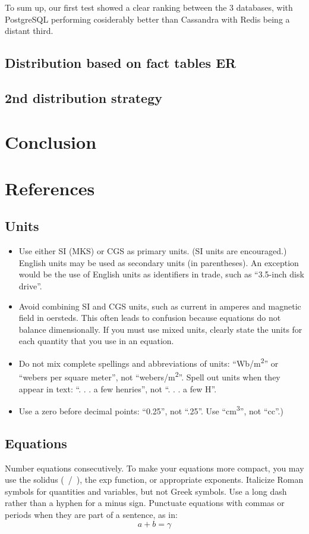 \documentclass[conference]{IEEEtran}
\begin{document}
To sum up, our first test showed a clear ranking between the 3 databases, with PostgreSQL performing cosiderably better than Cassandra with Redis being a distant third.

\subsection{Distribution based on fact tables ER}
\label{sec:distribution-based-on-fact-tables-er}


\subsection{2nd distribution strategy}
\label{sec:2nd-distribution-strategy}

\section{Conclusion}
\section{References}
\subsection{Units}
\begin{itemize}
	\item Use either SI (MKS) or CGS as primary units. (SI units are encouraged.) English units may be used as secondary units (in parentheses). An exception would be the use of English units as identifiers in trade, such as ``3.5-inch disk drive''.
	\item Avoid combining SI and CGS units, such as current in amperes and magnetic field in oersteds. This often leads to confusion because equations do not balance dimensionally. If you must use mixed units, clearly state the units for each quantity that you use in an equation.
	\item Do not mix complete spellings and abbreviations of units: ``Wb/m\textsuperscript{2}'' or ``webers per square meter'', not ``webers/m\textsuperscript{2}''. Spell out units when they appear in text: ``. . . a few henries'', not ``. . . a few H''.
	\item Use a zero before decimal points: ``0.25'', not ``.25''. Use ``cm\textsuperscript{3}'', not ``cc''.)
\end{itemize}

\subsection{Equations}
Number equations consecutively. To make your
equations more compact, you may use the solidus (~/~), the exp function, or
appropriate exponents. Italicize Roman symbols for quantities and variables,
but not Greek symbols. Use a long dash rather than a hyphen for a minus
sign. Punctuate equations with commas or periods when they are part of a
sentence, as in:
\begin{equation}
	a+b=\gamma\label{eq}
\end{equation}
\end{document}
